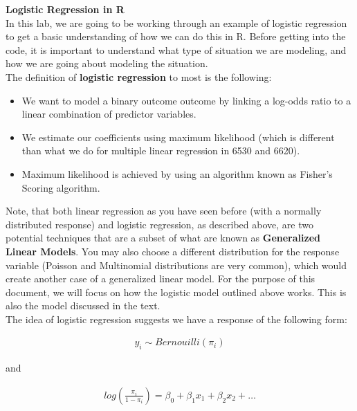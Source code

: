 \documentclass{article}
\begin{document}



\textbf{Logistic Regression in R}\\[.25cm]

In this lab, we are going to be working through an example of logistic regression to get a basic understanding of how we can do this in R.  Before getting into the code, it is important to understand what type of situation we are modeling, and how we are going about modeling the situation.\\[.25cm]

The definition of \textbf{logistic regression} to most is the following:\\[.25cm]

\begin{itemize}
\item We want to model a binary outcome outcome by linking a log-odds ratio to a linear combination of predictor variables.
\item We estimate our coefficients using maximum likelihood (which is different than what we do for multiple linear regression in 6530 and 6620).
\item Maximum likelihood is achieved by using an algorithm known as Fisher's Scoring algorithm.
\end{itemize}

Note, that both linear regression as you have seen before (with a normally distributed response) and logistic regression, as described above, are two potential techniques that are a subset of what are known as \textbf{Generalized Linear Models}.  You may also choose a different distribution for the response variable (Poisson and Multinomial distributions are very common), which would create another case of a generalized linear model. For the purpose of this document, we will focus on how the logistic model outlined above works.  This is also the model discussed in the text.\\[.25cm]

The idea of logistic regression suggests we have a response of the following form:

\begin{eqnarray*}
y_i \sim Bernouilli(\pi_i) 
\end{eqnarray*}

and 

\begin{eqnarray*}
log(\frac{\pi_i}{1-\pi_i}) = \beta_0 + \beta_1 x_1 + \beta_2 x_2 + \ldots 
\end{eqnarray*}
\end{document}
